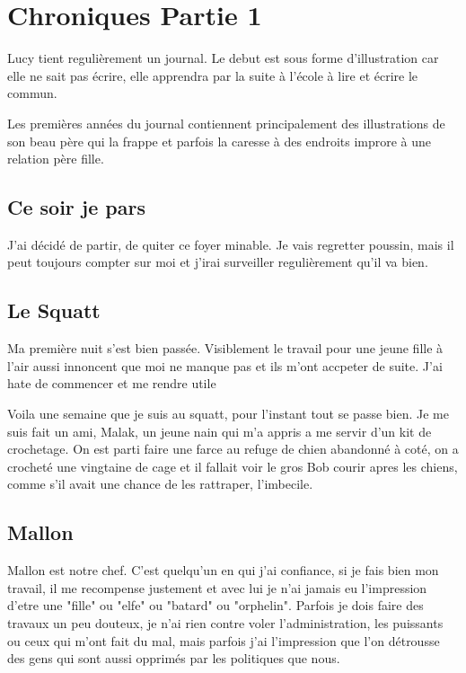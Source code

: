 \documentclass[10pt,a4paper,twoside,twocolumn,openany]{book}
\begin{document}
\vspace{2cm}

\chapter{Chroniques Partie 1}


\begin{quotebox}
Lucy tient regulièrement un journal. Le debut est sous forme d'illustration car elle ne sait pas écrire, elle 
apprendra par la suite à l'école à lire et écrire le commun.

Les premières années du journal contiennent principalement des illustrations de son beau père qui la frappe et parfois la caresse à des 
endroits improre à une relation père fille.
\end{quotebox}

\section{Ce soir je pars}

J'ai décidé de partir, de quiter ce foyer minable. Je vais regretter poussin, mais 
il peut toujours compter sur moi et j'irai surveiller regulièrement qu'il va bien.

\section{Le Squatt}

Ma première nuit s'est bien passée. Visiblement le travail pour une jeune fille
à l'air aussi innoncent que moi ne manque pas et ils m'ont accpeter de suite. J'ai
hate de commencer et me rendre utile

Voila une semaine que je suis au squatt, pour l'instant tout se passe bien. Je me 
suis fait un ami, Malak, un jeune nain qui m'a appris a me servir d'un kit de crochetage.
On est parti faire une farce au refuge de chien abandonné à coté, on a crocheté une vingtaine
de cage et il fallait voir le gros Bob courir apres les chiens, comme s'il avait une chance de
les rattraper, l'imbecile.

\section{Mallon}
Mallon est notre chef. C'est quelqu'un en qui j'ai confiance, si je fais bien mon travail, il me
recompense justement et avec lui je n'ai jamais eu l'impression d'etre une "fille" ou "elfe" ou
"batard" ou "orphelin". Parfois je dois faire des travaux un peu douteux, je n'ai rien contre voler
l'administration, les puissants ou ceux qui m'ont fait du mal, mais parfois j'ai l'impression que l'on
détrousse des gens qui sont aussi opprimés par les politiques que nous.
\end{document}
